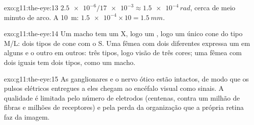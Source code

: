 \begin{solution}{exo:g11:the-eye:13}
$\num{2.5e-6}/\num{17e-3} \approx \num{1.5e-4}\,\unit{rad}$, cerca de
meio minuto de arco. A \qty{10}{m}: $\num{1.5e-4} \times 10 =
\qty{1.5}{mm}$.
\end{solution}

\begin{solution}{exo:g11:the-eye:14}
Um macho tem um X, logo um , logo um único cone do tipo M/L: dois
tipos de cone com o S. Uma fêmea com dois  diferentes expressa um
em alguns  e o outro em outros: três tipos, logo visão de três
cores; uma fêmea com dois  iguais tem dois tipos, como um macho.
\end{solution}

\begin{solution}{exo:g11:the-eye:15}
As  ganglionares e o nervo ótico estão intactos, de modo que os
pulsos elétricos entregues a eles chegam ao encéfalo visual como
sinais. A qualidade é limitada pelo número de eletrodos (centenas,
contra um milhão de fibras e milhões de receptores) e pela perda da
organização que a própria retina faz da imagem.
\end{solution}

